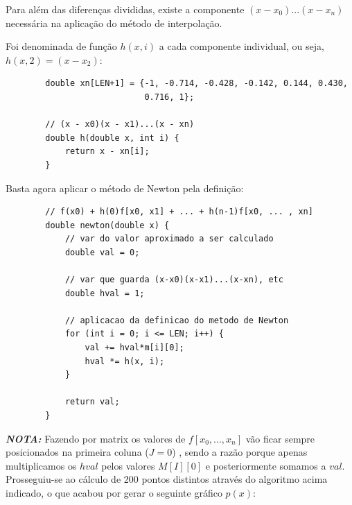 \documentclass[12pt, letterpaper,fleqn]{article}
\begin{document}
\begin{itemize}
    Para além das diferenças divididas, existe a componente $(x-x_0)...(x-x_n)$ necessária na aplicação do método de interpolação.

    Foi denominada de função $h(x,i)$ a cada componente individual, ou seja, $h(x, 2) = (x-x_2)$:

    \begin{verbatim}
        double xn[LEN+1] = {-1, -0.714, -0.428, -0.142, 0.144, 0.430, 
                            0.716, 1};
                            
        // (x - x0)(x - x1)...(x - xn)
        double h(double x, int i) {
            return x - xn[i];
        }
    \end{verbatim}

    Basta agora aplicar o método de Newton pela definição:

    \begin{verbatim}
        // f(x0) + h(0)f[x0, x1] + ... + h(n-1)f[x0, ... , xn]
        double newton(double x) {
            // var do valor aproximado a ser calculado
            double val = 0;
        
            // var que guarda (x-x0)(x-x1)...(x-xn), etc
            double hval = 1;
        
            // aplicacao da definicao do metodo de Newton
            for (int i = 0; i <= LEN; i++) {
                val += hval*m[i][0];
                hval *= h(x, i);
            }
            
            return val;
        }
    \end{verbatim}

    \textbf{\textit{NOTA:}} Fazendo por matrix os valores de $f[x_0, ... , x_n]$ vão ficar sempre posicionados na primeira coluna ($J=0$) , sendo a razão porque apenas multiplicamos os $hval$ pelos valores $M[I][0]$ e posteriormente somamos a $val$. \\

    Prosseguiu-se ao cálculo de 200 pontos distintos através do algoritmo acima indicado, o que acabou por gerar o seguinte gráfico $p(x)$:

    \begin{quote}
        \centering
    \end{quote}
    

\end{itemize}
\end{document}
